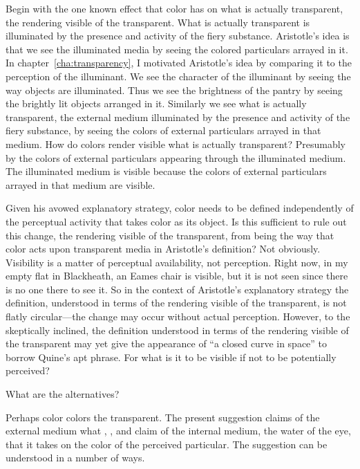Begin with the one known effect that color has on what is actually transparent, the rendering visible of the transparent. What is actually transparent is illuminated by the presence and activity of the fiery substance. Aristotle's idea is that we see the illuminated media by seeing the colored particulars arrayed in it. In chapter~\ref{cha:transparency}, I motivated Aristotle's idea by comparing it to the perception of the illuminant. We see the character of the illuminant by seeing the way objects are illuminated. Thus we see the brightness of the pantry by seeing the brightly lit objects arranged in it. Similarly we see what is actually transparent, the external medium illuminated by the presence and activity of the fiery substance, by seeing the colors of external particulars arrayed in that medium. How do colors render visible what is actually transparent? Presumably by the colors of external particulars appearing through the illuminated medium. The illuminated medium is visible because the colors of external particulars arrayed in that medium are visible. 

Given his avowed explanatory strategy, color needs to be defined independently of the perceptual activity that takes color as its object. Is this sufficient to rule out this change, the rendering visible of the transparent, from being the way that color acts upon transparent media in Aristotle's definition? Not obviously. Visibility is a matter of perceptual availability, not perception. Right now, in my empty flat in Blackheath, an Eames chair is visible, but it is not seen since there is no one there to see it. So in the context of Aristotle's explanatory strategy the definition, understood in terms of the rendering visible of the transparent, is not flatly circular---the change may occur without actual perception. However, to the skeptically inclined, the definition understood in terms of the rendering visible of the transparent may yet give the appearance of ``a closed curve in space'' to borrow Quine's \citeyearpar{Quine:1951fk} apt phrase. For what is it to be visible if not to be potentially perceived?

What are the alternatives? 

Perhaps color colors the transparent. The present suggestion claims of the external medium what \citet{Slakey:1961ss}, \citet{Sorabji:1974fk}, and \citet{Everson:1997ep} claim of the internal medium, the water of the eye, that it takes on the color of the perceived particular. The suggestion can be understood in a number of ways.

